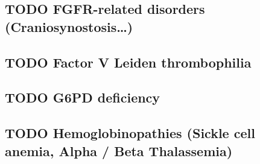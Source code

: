 \documentclass{scrartcl}
\begin{document}
\subsection{{\bfseries\sffamily TODO} FGFR-related disorders (Craniosynostosis\ldots{})}
\label{sec:org8d2d8d7}
\subsection{{\bfseries\sffamily TODO} Factor V Leiden thrombophilia}
\label{sec:org9abfc45}
\subsection{{\bfseries\sffamily TODO} G6PD deficiency}
\label{sec:org33d41c4}
\subsection{{\bfseries\sffamily TODO} Hemoglobinopathies (Sickle cell anemia, Alpha / Beta Thalassemia)}
\label{sec:org708e383}
\end{document}
